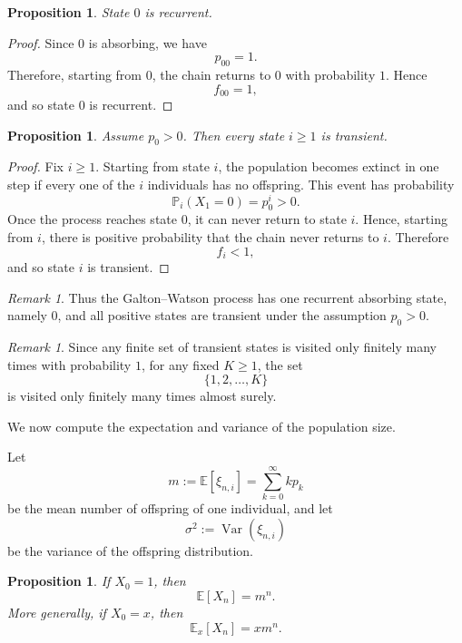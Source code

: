 \documentclass[11pt]{article}
\theoremstyle{plain}
\newtheorem{proposition}[theorem]{Proposition}
\theoremstyle{definition}
\theoremstyle{remark}
\newtheorem{remark}[theorem]{Remark}
\begin{document}
	\begin{proposition}
		State \(0\) is recurrent.
	\end{proposition}
	
	\begin{proof}
		Since \(0\) is absorbing, we have
		\[
		p_{00}=1.
		\]
		Therefore, starting from \(0\), the chain returns to \(0\) with probability \(1\). Hence
		\[
		f_{00}=1,
		\]
		and so state \(0\) is recurrent.
	\end{proof}
	
	\begin{proposition}
		Assume \(p_0>0\). Then every state \(i\ge 1\) is transient.
	\end{proposition}
	
	\begin{proof}
		Fix \(i\ge 1\). Starting from state \(i\), the population becomes extinct in one step if every one of the \(i\) individuals has no offspring. This event has probability
		\[
		\mathbb{P}_i(X_1=0)
		=
		p_0^i
		>
		0.
		\]
		Once the process reaches state \(0\), it can never return to state \(i\). Hence, starting from \(i\), there is positive probability that the chain never returns to \(i\). Therefore
		\[
		f_i<1,
		\]
		and so state \(i\) is transient.
	\end{proof}
	
	\begin{remark}
		Thus the Galton--Watson process has one recurrent absorbing state, namely \(0\), and all positive states are transient under the assumption \(p_0>0\).
	\end{remark}
	
	\begin{remark}
		Since any finite set of transient states is visited only finitely many times with probability \(1\), for any fixed \(K\ge 1\), the set
		\[
		\{1,2,\dots,K\}
		\]
		is visited only finitely many times almost surely.
	\end{remark}
	
	
	We now compute the expectation and variance of the population size.
	
	Let
	\[
	m:=\mathbb{E}[\xi_{n,i}]
	=
	\sum_{k=0}^{\infty}kp_k
	\]
	be the mean number of offspring of one individual, and let
	\[
	\sigma^2
	:=
	\operatorname{Var}(\xi_{n,i})
	\]
	be the variance of the offspring distribution.
	
	\begin{proposition}
		If \(X_0=1\), then
		\[
		\mathbb{E}[X_n]=m^n.
		\]
		More generally, if \(X_0=x\), then
		\[
		\mathbb{E}_x[X_n]=xm^n.
		\]
	\end{proposition}
	
\end{document}
